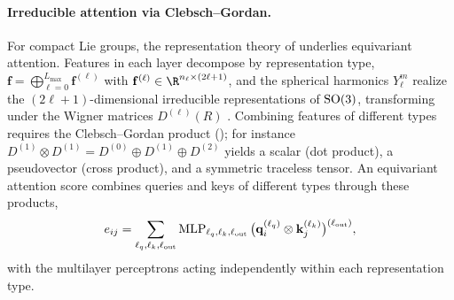\paragraph{Irreducible attention via Clebsch--Gordan.}
For compact Lie groups, the representation theory of 
underlies equivariant attention. Features in each layer decompose by
representation type, $\mathbf{f} = \bigoplus_{\ell=0}^{L_{\max}}
\mathbf{f}^{(\ell)}$ with $\mathbf{f}^{(\ell)} \in \R^{n_\ell \times (2\ell+1)}$,
and the spherical harmonics $Y_\ell^m$ realize the $(2\ell+1)$-dimensional
irreducible representations of $\operatorname{SO}(3)$, transforming under the Wigner matrices
$D^{(\ell)}(R)$ \citep{brocker1985representations}. Combining features of
different types requires the Clebsch--Gordan product
(); for instance $D^{(1)} \otimes D^{(1)} =
D^{(0)} \oplus D^{(1)} \oplus D^{(2)}$ yields a scalar (dot product), a
pseudovector (cross product), and a symmetric traceless tensor. An equivariant
attention score combines queries and keys of different types through these
products,
\begin{equation}
  e_{ij} = \sum_{\ell_q, \ell_k, \ell_{\text{out}}}
    \operatorname{MLP}_{\ell_q, \ell_k, \ell_{\text{out}}}
    \big(\mathbf{q}_i^{(\ell_q)} \otimes \mathbf{k}_j^{(\ell_k)}
    \big)^{(\ell_{\text{out}})},
\end{equation}
with the multilayer perceptrons acting independently within each representation
type.

